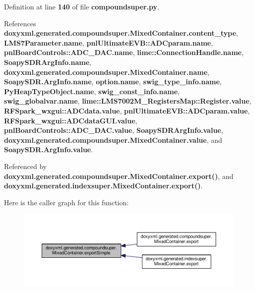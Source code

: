 Definition at line {\bf 140} of file {\bf compoundsuper.\+py}.



References {\bf doxyxml.\+generated.\+compoundsuper.\+Mixed\+Container.\+content\+\_\+type}, {\bf L\+M\+S7\+Parameter.\+name}, {\bf pnl\+Ultimate\+E\+V\+B\+::\+A\+D\+Cparam.\+name}, {\bf pnl\+Board\+Controls\+::\+A\+D\+C\+\_\+\+D\+A\+C.\+name}, {\bf lime\+::\+Connection\+Handle.\+name}, {\bf Soapy\+S\+D\+R\+Arg\+Info.\+name}, {\bf doxyxml.\+generated.\+compoundsuper.\+Mixed\+Container.\+name}, {\bf Soapy\+S\+D\+R.\+Arg\+Info.\+name}, {\bf option.\+name}, {\bf swig\+\_\+type\+\_\+info.\+name}, {\bf Py\+Heap\+Type\+Object.\+name}, {\bf swig\+\_\+const\+\_\+info.\+name}, {\bf swig\+\_\+globalvar.\+name}, {\bf lime\+::\+L\+M\+S7002\+M\+\_\+\+Registers\+Map\+::\+Register.\+value}, {\bf R\+F\+Spark\+\_\+wxgui\+::\+A\+D\+Cdata.\+value}, {\bf pnl\+Ultimate\+E\+V\+B\+::\+A\+D\+Cparam.\+value}, {\bf R\+F\+Spark\+\_\+wxgui\+::\+A\+D\+Cdata\+G\+U\+I.\+value}, {\bf pnl\+Board\+Controls\+::\+A\+D\+C\+\_\+\+D\+A\+C.\+value}, {\bf Soapy\+S\+D\+R\+Arg\+Info.\+value}, {\bf doxyxml.\+generated.\+compoundsuper.\+Mixed\+Container.\+value}, and {\bf Soapy\+S\+D\+R.\+Arg\+Info.\+value}.



Referenced by {\bf doxyxml.\+generated.\+compoundsuper.\+Mixed\+Container.\+export()}, and {\bf doxyxml.\+generated.\+indexsuper.\+Mixed\+Container.\+export()}.



Here is the caller graph for this function\+:
\nopagebreak
\begin{figure}[H]
\begin{center}
\leavevmode
\includegraphics[width=350pt]{d0/dfc/classdoxyxml_1_1generated_1_1compoundsuper_1_1MixedContainer_a295d96037658e8e16bca5178fb7a0c82_icgraph}
\end{center}
\end{figure}


